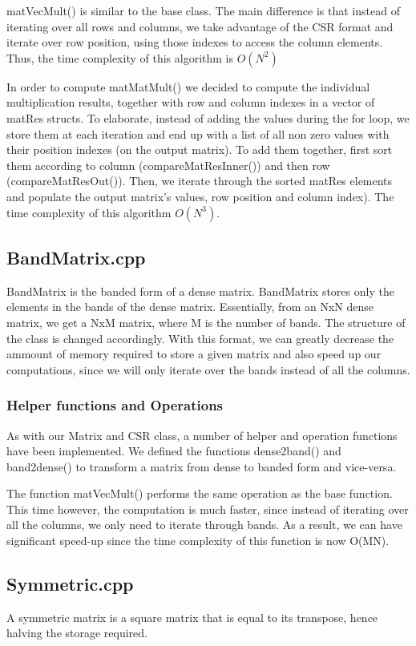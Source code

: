 \documentclass[11pt]{article}
\begin{document}
matVecMult() is similar to the base class. The main difference is that instead
of iterating over all rows and columns, we take advantage of the CSR format and
iterate over row position, using those indexes to access the column elements.
Thus, the time complexity of this algorithm is \(O(N^2)\)

In order to compute matMatMult() we decided to compute the individual multiplication
results, together with row and column indexes in a vector of matRes structs.
To elaborate, instead of adding the values during the for loop, we store them at
each iteration and end up with a list of all non zero values with their position
indexes (on the output matrix). To add them together, first sort them according
to column (compareMatResInner()) and then row (compareMatResOut()). Then, we
iterate through the sorted matRes elements and populate the output matrix's
values, row position and column index). The time complexity of this algorithm \(O(N^3)\).

\subsection{BandMatrix.cpp}
\label{sec:org717bbae}
BandMatrix is the banded form of a dense matrix. BandMatrix stores only the elements
in the bands of the dense matrix. Essentially, from an NxN dense matrix, we get
a NxM matrix, where M is the number of bands. The structure of the class is
changed accordingly. With this format, we can greatly decrease the ammount of 
memory required to store a given matrix and also speed up our computations, 
since we will only iterate over the bands instead of all the columns.

\subsubsection{Helper functions and Operations}
\label{sec:org1cfd843}
As with our Matrix and CSR class, a number of helper and operation functions have been
implemented. We defined the functions dense2band() and band2dense() to transform
a matrix from dense to banded form and vice-versa.

The function matVecMult() performs the same operation as the base function. This
time however, the computation is much faster, since instead of iterating over
all the columns, we only need to iterate through bands. As a result, we can have
significant speed-up since the time complexity of this function is now O(MN).

\subsection{Symmetric.cpp}
\label{sec:org961a573}
A symmetric matrix is a square matrix that is equal to its transpose, hence
halving the storage required.
\end{document}
